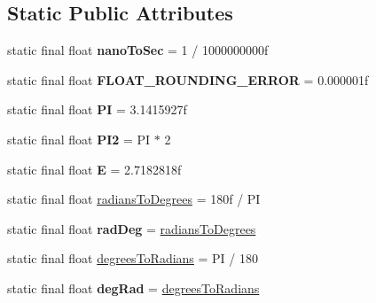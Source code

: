 \subsection*{Static Public Attributes}
\begin{DoxyCompactItemize}
\item 
\hypertarget{classairhockeyjava_1_1util_1_1_math_utils_abff18ddb778dbe0d355121d4dd1715d2}{}static final float {\bfseries nano\+To\+Sec} = 1 / 1000000000f\label{classairhockeyjava_1_1util_1_1_math_utils_abff18ddb778dbe0d355121d4dd1715d2}

\item 
\hypertarget{classairhockeyjava_1_1util_1_1_math_utils_ad8d1362ec35028ba64e01bcb00173710}{}static final float {\bfseries F\+L\+O\+A\+T\+\_\+\+R\+O\+U\+N\+D\+I\+N\+G\+\_\+\+E\+R\+R\+O\+R} = 0.\+000001f\label{classairhockeyjava_1_1util_1_1_math_utils_ad8d1362ec35028ba64e01bcb00173710}

\item 
\hypertarget{classairhockeyjava_1_1util_1_1_math_utils_ac86b3518dff28e8adfad70f66a6094e6}{}static final float {\bfseries P\+I} = 3.\+1415927f\label{classairhockeyjava_1_1util_1_1_math_utils_ac86b3518dff28e8adfad70f66a6094e6}

\item 
\hypertarget{classairhockeyjava_1_1util_1_1_math_utils_a654b4db78b5aa536971dbe044531d338}{}static final float {\bfseries P\+I2} = P\+I $\ast$ 2\label{classairhockeyjava_1_1util_1_1_math_utils_a654b4db78b5aa536971dbe044531d338}

\item 
\hypertarget{classairhockeyjava_1_1util_1_1_math_utils_a1b61c4292a2c16d25024209acd39fb54}{}static final float {\bfseries E} = 2.\+7182818f\label{classairhockeyjava_1_1util_1_1_math_utils_a1b61c4292a2c16d25024209acd39fb54}

\item 
static final float \hyperlink{classairhockeyjava_1_1util_1_1_math_utils_a788a82da7103c1416430a2d7c6e381f6}{radians\+To\+Degrees} = 180f / P\+I
\item 
\hypertarget{classairhockeyjava_1_1util_1_1_math_utils_aa9be6d9992642d1b07f00a58dd872867}{}static final float {\bfseries rad\+Deg} = \hyperlink{classairhockeyjava_1_1util_1_1_math_utils_a788a82da7103c1416430a2d7c6e381f6}{radians\+To\+Degrees}\label{classairhockeyjava_1_1util_1_1_math_utils_aa9be6d9992642d1b07f00a58dd872867}

\item 
static final float \hyperlink{classairhockeyjava_1_1util_1_1_math_utils_a08b83ca8c80a44447cb6c33fab79413e}{degrees\+To\+Radians} = P\+I / 180
\item 
\hypertarget{classairhockeyjava_1_1util_1_1_math_utils_a99324a6a275a7a10702b1f73a5e09d5c}{}static final float {\bfseries deg\+Rad} = \hyperlink{classairhockeyjava_1_1util_1_1_math_utils_a08b83ca8c80a44447cb6c33fab79413e}{degrees\+To\+Radians}\label{classairhockeyjava_1_1util_1_1_math_utils_a99324a6a275a7a10702b1f73a5e09d5c}


\end{DoxyCompactItemize}
